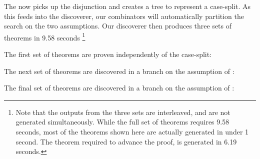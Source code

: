 The  now picks up the disjunction and creates a tree to represent a case-split. As this feeds into the discoverer, our combinators will automatically partition the search on the two assumptions. Our discoverer then produces three sets of theorems in 9.58 seconds \footnote{Note that the outputs from the three sets are interleaved, and are not generated simultaneously. While the full set of theorems requires 9.58 seconds, most of the theorems shown here are actually generated in under 1 second. The theorem required to advance the proof,  is generated in 6.19 seconds.}

The first set of theorems are proven independently of the case-split:

\vspace{0.2cm}
\noindent{}
\vspace{0.1cm}

The next set of theorems are discovered in a branch on the assumption of :

\vspace{0.2cm}
\noindent{}
\vspace{0.1cm}

The final set of theorems are discovered in a branch on the assumption of :

\vspace{0.2cm}
\noindent{}
\vspace{0.1cm}

